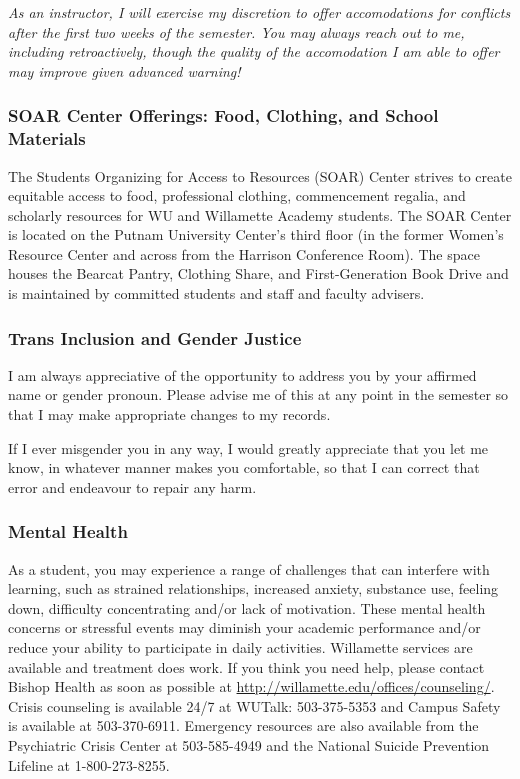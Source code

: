 \textit{As an instructor, I will exercise my discretion to offer accomodations for conflicts after the first two weeks of the semester. You may always reach out to me, including retroactively, though the quality of the accomodation I am able to offer may improve given advanced warning!}

\subsubsection*{SOAR Center Offerings: Food, Clothing, and School Materials}

The Students Organizing for Access to Resources (SOAR) Center strives to create equitable access to food, professional clothing, commencement regalia, and scholarly resources for WU and Willamette Academy students. The SOAR Center is located on the Putnam University Center's third floor (in the former Women's Resource Center and across from the Harrison Conference Room). The space houses the Bearcat Pantry, Clothing Share, and First-Generation Book Drive and is maintained by committed students and staff and faculty advisers.

\subsubsection*{Trans Inclusion and Gender Justice}

I am always appreciative of the opportunity to address you by your affirmed name or gender pronoun. Please advise me of this at any point in the semester so that I may make appropriate changes to my records.

If I ever misgender you in any way, I would greatly appreciate that you let me know, in whatever manner makes you comfortable, so that I can correct that error and endeavour to repair any harm. 

\subsubsection*{Mental Health}
As a student, you may experience a range of challenges that can interfere with learning, such as strained
relationships, increased anxiety, substance use, feeling down, difficulty concentrating and/or lack of
motivation. These mental health concerns or stressful events may diminish your academic performance and/or
reduce your ability to participate in daily activities. Willamette services are available and treatment does work.
If you think you need help, please contact Bishop Health as soon as possible at
\url{http://willamette.edu/offices/counseling/}. Crisis counseling is available 24/7 at WUTalk: 503-375-5353 and
Campus Safety is available at 503-370-6911. Emergency resources are also available from the Psychiatric
Crisis Center at 503-585-4949 and the National Suicide Prevention Lifeline at 1-800-273-8255.
